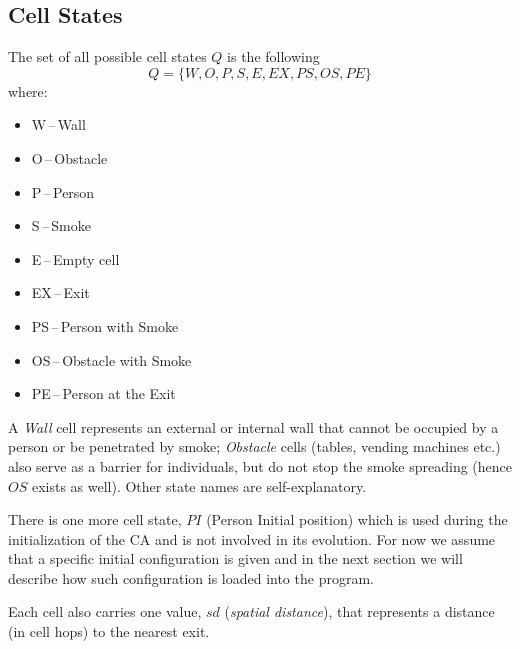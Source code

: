 \subsection{Cell States}
The set of all possible cell states $Q$ is the following
$$Q = \{W,O,P,S,E,EX,PS,OS,PE\}$$ where:
\begin{itemize}
    \item W\,--\,Wall
    \item O\,--\,Obstacle
    \item P\,--\,Person
    \item S\,--\,Smoke
    \item E\,--\,Empty cell
    \item EX\,--\,Exit
    \item PS\,--\,Person with Smoke
    \item OS\,--\,Obstacle with Smoke
    \item PE\,--\,Person at the Exit
\end{itemize}

A \emph{Wall} cell represents an external or internal wall that cannot be occupied 
by a person or be penetrated by smoke; \emph{Obstacle} cells (tables, vending 
machines etc.) also serve as a barrier for individuals, but do not stop the smoke 
spreading (hence $OS$ exists as well).
Other state names are self-explanatory.

There is one more cell state, $PI$ (Person Initial position) which is used during 
the initialization of the CA and is not involved in its evolution.
For now we assume that a specific initial configuration is given and in the next 
section we will describe how such configuration is loaded into the program.

Each cell also carries one value, $sd$ (\emph{spatial distance}), that represents a 
distance (in cell hops) to the nearest exit.

